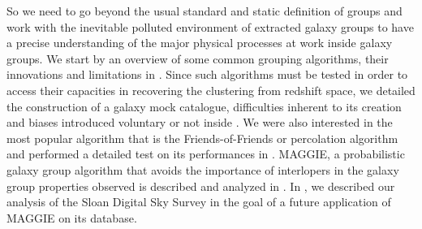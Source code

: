 So we need to go beyond the usual standard and static definition of groups and
work with the inevitable polluted environment of extracted galaxy groups to
have a precise understanding of the major physical processes at work inside
galaxy groups. We start by an overview of some common grouping algorithms,
their innovations and limitations in .
Since such algorithms must be tested in order to access their capacities in
recovering the clustering from redshift space, we detailed the construction of
a galaxy mock catalogue, difficulties inherent to its creation and biases
introduced voluntary or not inside . We were also
interested in the most popular algorithm that is the Friends-of-Friends or
percolation algorithm and performed a detailed test on its performances in
. MAGGIE, a probabilistic galaxy
group algorithm that avoids the importance of interlopers in the galaxy group
properties observed is described and analyzed in . In
, we described our analysis of the Sloan Digital Sky
Survey in the goal of a future application of MAGGIE on its database.

